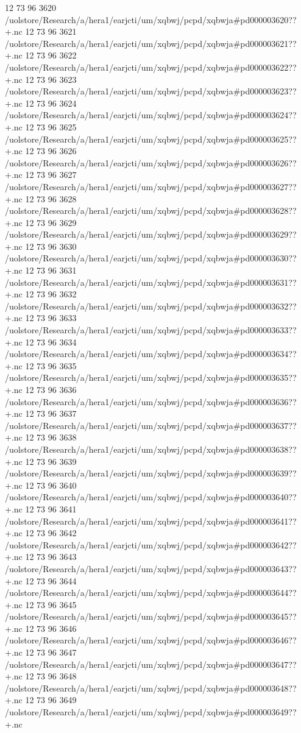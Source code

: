 12 73 96
3620
/uolstore/Research/a/hera1/earjcti/um/xqbwj/pcpd/xqbwja#pd000003620??+.nc
12 73 96
3621
/uolstore/Research/a/hera1/earjcti/um/xqbwj/pcpd/xqbwja#pd000003621??+.nc
12 73 96
3622
/uolstore/Research/a/hera1/earjcti/um/xqbwj/pcpd/xqbwja#pd000003622??+.nc
12 73 96
3623
/uolstore/Research/a/hera1/earjcti/um/xqbwj/pcpd/xqbwja#pd000003623??+.nc
12 73 96
3624
/uolstore/Research/a/hera1/earjcti/um/xqbwj/pcpd/xqbwja#pd000003624??+.nc
12 73 96
3625
/uolstore/Research/a/hera1/earjcti/um/xqbwj/pcpd/xqbwja#pd000003625??+.nc
12 73 96
3626
/uolstore/Research/a/hera1/earjcti/um/xqbwj/pcpd/xqbwja#pd000003626??+.nc
12 73 96
3627
/uolstore/Research/a/hera1/earjcti/um/xqbwj/pcpd/xqbwja#pd000003627??+.nc
12 73 96
3628
/uolstore/Research/a/hera1/earjcti/um/xqbwj/pcpd/xqbwja#pd000003628??+.nc
12 73 96
3629
/uolstore/Research/a/hera1/earjcti/um/xqbwj/pcpd/xqbwja#pd000003629??+.nc
12 73 96
3630
/uolstore/Research/a/hera1/earjcti/um/xqbwj/pcpd/xqbwja#pd000003630??+.nc
12 73 96
3631
/uolstore/Research/a/hera1/earjcti/um/xqbwj/pcpd/xqbwja#pd000003631??+.nc
12 73 96
3632
/uolstore/Research/a/hera1/earjcti/um/xqbwj/pcpd/xqbwja#pd000003632??+.nc
12 73 96
3633
/uolstore/Research/a/hera1/earjcti/um/xqbwj/pcpd/xqbwja#pd000003633??+.nc
12 73 96
3634
/uolstore/Research/a/hera1/earjcti/um/xqbwj/pcpd/xqbwja#pd000003634??+.nc
12 73 96
3635
/uolstore/Research/a/hera1/earjcti/um/xqbwj/pcpd/xqbwja#pd000003635??+.nc
12 73 96
3636
/uolstore/Research/a/hera1/earjcti/um/xqbwj/pcpd/xqbwja#pd000003636??+.nc
12 73 96
3637
/uolstore/Research/a/hera1/earjcti/um/xqbwj/pcpd/xqbwja#pd000003637??+.nc
12 73 96
3638
/uolstore/Research/a/hera1/earjcti/um/xqbwj/pcpd/xqbwja#pd000003638??+.nc
12 73 96
3639
/uolstore/Research/a/hera1/earjcti/um/xqbwj/pcpd/xqbwja#pd000003639??+.nc
12 73 96
3640
/uolstore/Research/a/hera1/earjcti/um/xqbwj/pcpd/xqbwja#pd000003640??+.nc
12 73 96
3641
/uolstore/Research/a/hera1/earjcti/um/xqbwj/pcpd/xqbwja#pd000003641??+.nc
12 73 96
3642
/uolstore/Research/a/hera1/earjcti/um/xqbwj/pcpd/xqbwja#pd000003642??+.nc
12 73 96
3643
/uolstore/Research/a/hera1/earjcti/um/xqbwj/pcpd/xqbwja#pd000003643??+.nc
12 73 96
3644
/uolstore/Research/a/hera1/earjcti/um/xqbwj/pcpd/xqbwja#pd000003644??+.nc
12 73 96
3645
/uolstore/Research/a/hera1/earjcti/um/xqbwj/pcpd/xqbwja#pd000003645??+.nc
12 73 96
3646
/uolstore/Research/a/hera1/earjcti/um/xqbwj/pcpd/xqbwja#pd000003646??+.nc
12 73 96
3647
/uolstore/Research/a/hera1/earjcti/um/xqbwj/pcpd/xqbwja#pd000003647??+.nc
12 73 96
3648
/uolstore/Research/a/hera1/earjcti/um/xqbwj/pcpd/xqbwja#pd000003648??+.nc
12 73 96
3649
/uolstore/Research/a/hera1/earjcti/um/xqbwj/pcpd/xqbwja#pd000003649??+.nc
